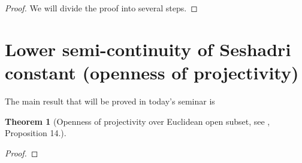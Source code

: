 \documentclass[11pt]{article}
\theoremstyle{definition}
\newtheorem{theorem}{Theorem}[section]
\newtheorem{remark}[theorem]{Remark}
\begin{document}
	\begin{proof}
		We will divide the proof into several steps.
		
	\end{proof}
	
	
	\section{Lower semi-continuity of Seshadri constant (openness of projectivity)}
	
	The main result that will be proved in today's seminar is 	
	\begin{theorem}[Openness of projectivity over Euclidean open subset, see \cite{Seshardri}, Proposition 14.]
		
	\end{theorem}
	
	
	\begin{proof}
		
	\end{proof}
	
	
%	
%	
%	
%	
%	
%	
%		
%
%
%	
	\printbibliography	
	
\end{document}
